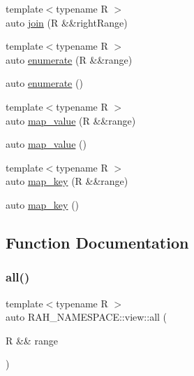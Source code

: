 \begin{DoxyCompactItemize}
\item 
{\footnotesize template$<$typename R $>$ }\\auto \mbox{\hyperlink{namespace_r_a_h___n_a_m_e_s_p_a_c_e_1_1view_a3aa69fad7b8d770b21d40e5c035a4915}{join}} (R \&\&right\+Range)
\item 
{\footnotesize template$<$typename R $>$ }\\auto \mbox{\hyperlink{namespace_r_a_h___n_a_m_e_s_p_a_c_e_1_1view_af6c7a1ce5dc82cc30a2cb2b5bd06bbc9}{enumerate}} (R \&\&range)
\item 
auto \mbox{\hyperlink{namespace_r_a_h___n_a_m_e_s_p_a_c_e_1_1view_a9ad7523e299040463d2a6a199d9280af}{enumerate}} ()
\item 
{\footnotesize template$<$typename R $>$ }\\auto \mbox{\hyperlink{namespace_r_a_h___n_a_m_e_s_p_a_c_e_1_1view_a3b3bc1ea8a0f62e62fd78dedcecf12de}{map\+\_\+value}} (R \&\&range)
\item 
auto \mbox{\hyperlink{namespace_r_a_h___n_a_m_e_s_p_a_c_e_1_1view_aafb6ab43a3bb190d38c15d322912254a}{map\+\_\+value}} ()
\item 
{\footnotesize template$<$typename R $>$ }\\auto \mbox{\hyperlink{namespace_r_a_h___n_a_m_e_s_p_a_c_e_1_1view_a6c84c62b5257eb2001b350a684cf4382}{map\+\_\+key}} (R \&\&range)
\item 
auto \mbox{\hyperlink{namespace_r_a_h___n_a_m_e_s_p_a_c_e_1_1view_a3609e93701c48bc01de9598ac05b0762}{map\+\_\+key}} ()
\end{DoxyCompactItemize}


\subsection{Function Documentation}
\mbox{\label{namespace_r_a_h___n_a_m_e_s_p_a_c_e_1_1view_a97c539065057a274bc3209460378504c}} 
\subsubsection{\texorpdfstring{all()}{all()}\hspace{0.1cm}{\footnotesize\ttfamily [1/2]}}
{\footnotesize\ttfamily template$<$typename R $>$ \\
auto R\+A\+H\+\_\+\+N\+A\+M\+E\+S\+P\+A\+C\+E\+::view\+::all (\begin{DoxyParamCaption}\item[{R \&\&}]{range }\end{DoxyParamCaption})}

